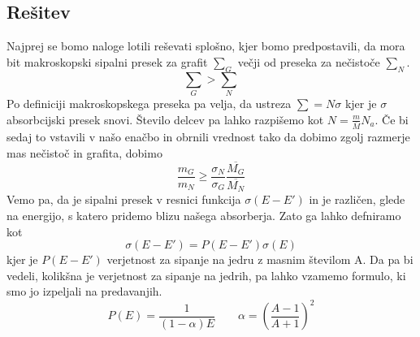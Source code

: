 \documentclass[slovene,11pt,a4paper]{article}
\begin{document}
\subsection*{Rešitev}
Najprej se bomo naloge lotili reševati splošno, kjer bomo predpostavili, da mora bit makroskopski sipalni presek za grafit $\sum_G$ večji od preseka za nečistoče $\sum_N$.
\begin{equation}
     \sum_G>\sum_N
\end{equation}
Po definiciji makroskopskega preseka pa velja, da ustreza $\sum=N\sigma$ kjer je $\sigma$ absorbcijski presek snovi. Število delcev pa lahko razpišemo kot $N=\frac{m}{\overline{M}}N_a$. Če bi sedaj to vstavili v našo enačbo in obrnili vrednost tako da dobimo zgolj razmerje mas nečistoč in grafita, dobimo
\begin{equation}
    \frac{m_G}{m_N}\geq \frac{\sigma_N}{\sigma_G}\frac{\overline{M_G}}{\overline{M_N}}
    \label{razmerje}
\end{equation}
Vemo pa, da je sipalni presek v resnici funkcija $\sigma(E-E')$ in je različen, glede na energijo, s katero pridemo blizu našega absorberja. Zato ga lahko defniramo kot 
\begin{equation}
    \sigma(E-E')=P(E-E')\sigma(E)
    \label{sipalni}
\end{equation}
kjer je $P(E-E')$ verjetnost za sipanje na jedru z masnim številom A. Da pa bi vedeli, kolikšna je verjetnost za sipanje na jedrih, pa lahko vzamemo formulo, ki smo jo izpeljali na predavanjih.
\begin{equation}
    P(E)=\frac{1}{(1-\alpha)E} \qquad \alpha=\left(\frac{A-1}{A+1}\right)^2
    \label{verjetnost}
\end{equation}
\end{document}

